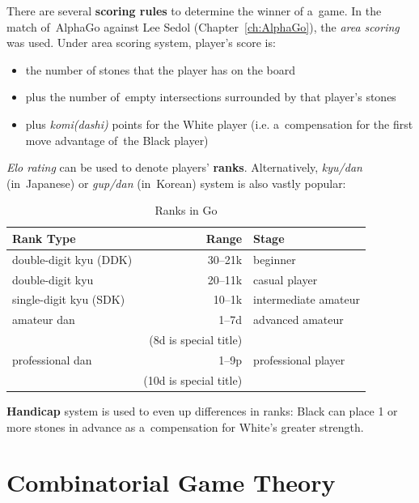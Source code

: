 There are several \textbf{scoring rules} to determine the winner of a~game.
In the match of~AlphaGo against Lee Sedol (Chapter~\ref{ch:AlphaGo}),
the \emph{area scoring} was used.
Under area scoring system, player's score is:
\begin{itemize}
  \item the number of stones that the player has on the board
  \item plus the number of~empty intersections surrounded by that player's stones
  \item plus \emph{komi(dashi)} points for the White player (i.e. a~compensation for the first move advantage of~the Black player)
\end{itemize}

\emph{Elo rating} can be used to denote players' \textbf{ranks}.
Alternatively, \emph{kyu/dan} (in~Japanese) or \emph{gup/dan} (in~Korean) system is also vastly popular:
\begin{table}[!htbp]
  \centering
  \begin{tabular}{ |l|r|l| }
    \hline
    \textbf{Rank Type} & \textbf{Range} & \textbf{Stage} \\
    \hline
    double-digit kyu\footnotemark{} (DDK) & 30--21k & beginner \\
    double-digit kyu                      & 20--11k & casual player \\
    single-digit kyu (SDK)                & 10--1k  & intermediate amateur \\
    amateur dan                           & 1--7d   & advanced amateur \\
    ~ & (8d is special title) & ~ \\
    professional dan                      & 1--9p   & professional player \\
    ~ & (10d is special title) & ~ \\
    \hline
  \end{tabular}
  \caption{Ranks in Go}
  \label{tab:Go-ranks}
\end{table}

\textbf{Handicap} system is used to even up differences in ranks:
Black can place 1 or more stones in advance as a~compensation for White's greater strength.

\section{Combinatorial Game Theory}
\label{sec:CGT}
\todo

